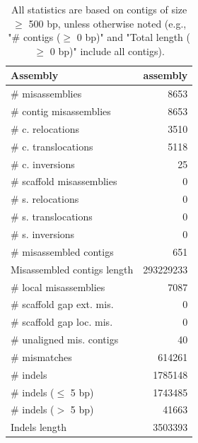 \documentclass[12pt,a4paper]{article}
\begin{document}
\begin{table}[ht]
\begin{center}
\caption{All statistics are based on contigs of size $\geq$ 500 bp, unless otherwise noted (e.g., "\# contigs ($\geq$ 0 bp)" and "Total length ($\geq$ 0 bp)" include all contigs).}
\begin{tabular}{|l*{1}{|r}|}
\hline
Assembly & assembly \\ \hline
\# misassemblies & 8653 \\ \hline
\hspace{2mm}\# contig misassemblies & 8653 \\ \hline
\hspace{5mm}\# c. relocations & 3510 \\ \hline
\hspace{5mm}\# c. translocations & 5118 \\ \hline
\hspace{5mm}\# c. inversions & 25 \\ \hline
\hspace{2mm}\# scaffold misassemblies & 0 \\ \hline
\hspace{5mm}\# s. relocations & 0 \\ \hline
\hspace{5mm}\# s. translocations & 0 \\ \hline
\hspace{5mm}\# s. inversions & 0 \\ \hline
\# misassembled contigs & 651 \\ \hline
Misassembled contigs length & 293229233 \\ \hline
\# local misassemblies & 7087 \\ \hline
\# scaffold gap ext. mis. & 0 \\ \hline
\# scaffold gap loc. mis. & 0 \\ \hline
\# unaligned mis. contigs & 40 \\ \hline
\# mismatches & 614261 \\ \hline
\# indels & 1785148 \\ \hline
\hspace{5mm}\# indels ($\leq$ 5 bp) & 1743485 \\ \hline
\hspace{5mm}\# indels ($>$ 5 bp) & 41663 \\ \hline
Indels length & 3503393 \\ \hline
\end{tabular}
\end{center}
\end{table}
\end{document}
